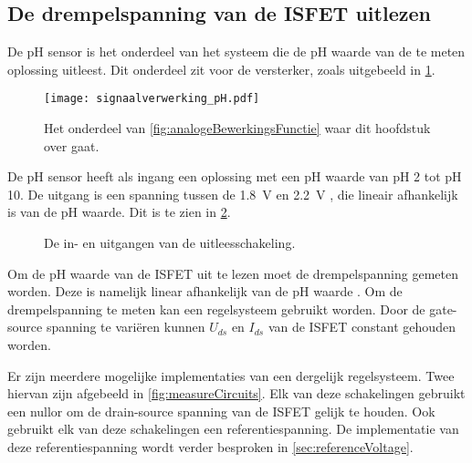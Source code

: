 \subsection{De drempelspanning van de ISFET uitlezen} \label{sec:ISFETLees}

De pH sensor is het onderdeel van het systeem die de pH waarde van de te meten oplossing uitleest. Dit onderdeel zit voor de versterker, zoals uitgebeeld in \cref{fig:pHInSchema}.
\begin{figure}[!htbp]
    \centering
    \texttt{[image: signaalverwerking\_pH.pdf]}
    \caption{Het onderdeel van \cref{fig:analogeBewerkingsFunctie} waar dit hoofdstuk over gaat.}
    \label{fig:pHInSchema}
\end{figure}

De pH sensor heeft als ingang een oplossing met een pH waarde van pH 2 tot pH 10. De uitgang is een spanning tussen de \qty{1.8}{\volt} en \qty{2.2}{\volt} \cite{isfet}, die lineair afhankelijk is van de pH waarde. Dit is te zien in \cref{fig:uitleesBlok}.

\begin{figure}[!htbp]
    \centering
    \def\svgwidth{0.4\textwidth}
    
    \caption{De in- en uitgangen van de uitleesschakeling.}
    \label{fig:uitleesBlok}
\end{figure}

Om de pH waarde van de ISFET uit te lezen moet de drempelspanning gemeten worden. Deze is namelijk linear afhankelijk van de pH waarde \cite{iontjes}.
Om de drempelspanning te meten kan een regelsysteem gebruikt worden. Door de gate-source spanning te variëren kunnen $U_{ds}$ en $I_{ds}$ van de ISFET constant gehouden worden.

Er zijn meerdere mogelijke implementaties van een dergelijk regelsysteem. Twee hiervan zijn afgebeeld in \cref{fig:measureCircuits}.
Elk van deze schakelingen gebruikt een nullor om de drain-source spanning van de ISFET gelijk te houden. Ook gebruikt elk van deze schakelingen een referentiespanning. De implementatie van deze referentiespanning wordt verder besproken in \cref{sec:referenceVoltage}.

